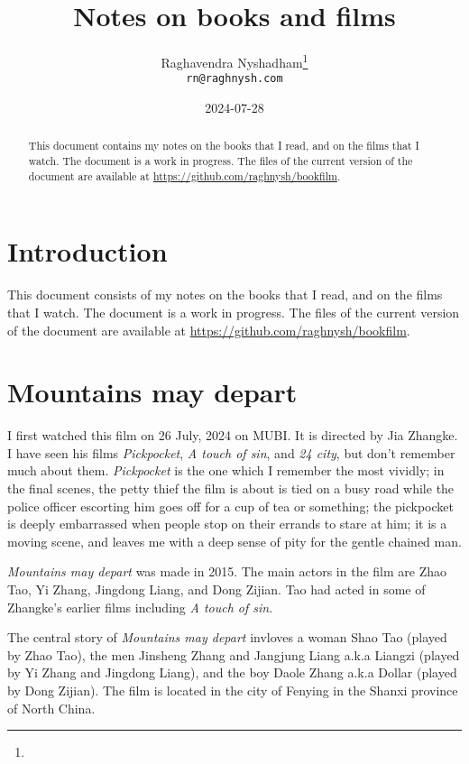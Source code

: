\documentclass{article}
\title{Notes on books and films}
\author{Raghavendra Nyshadham\thanks{\cczero} \\
  {\normalsize\nolinkurl{rn@raghnysh.com}}}
\date{2024-07-28}
\begin{document}
\begin{titlingpage}
  \maketitle

  \begin{abstract}
    This document contains my notes on the books that I read, and on
    the films that I watch.  The document is a work in progress.  The
    files of the current version of the document are available at
    \url{https://github.com/raghnysh/bookfilm}.

  \end{abstract}
\end{titlingpage}

\tableofcontents

\section{Introduction}
\label{sec:113nrd0o}

This document consists of my notes on the books that I read, and on
the films that I watch.  The document is a work in progress.  The
files of the current version of the document are available at
\url{https://github.com/raghnysh/bookfilm}.

\section{Mountains may depart}
\label{sec:ov8yna0s}

I first watched this film on 26 July, 2024 on MUBI.  It is directed by
Jia Zhangke.  I have seen his films \emph{Pickpocket}, \emph{A touch
  of sin}, and \emph{24 city}, but don't remember much about them.
\emph{Pickpocket} is the one which I remember the most vividly; in the
final scenes, the petty thief the film is about is tied on a busy road
while the police officer escorting him goes off for a cup of tea or
something; the pickpocket is deeply embarrassed when people stop on
their errands to stare at him; it is a moving scene, and leaves me
with a deep sense of pity for the gentle chained man.

\emph{Mountains may depart} was made in 2015.  The main actors in the
film are Zhao Tao, Yi Zhang, Jingdong Liang, and Dong Zijian.  Tao had
acted in some of Zhangke's earlier films including \emph{A touch of
  sin}.

The central story of \emph{Mountains may depart} invloves a woman Shao
Tao (played by Zhao Tao), the men Jinsheng Zhang and Jangjung Liang
a.k.a Liangzi (played by Yi Zhang and Jingdong Liang), and the boy
Daole Zhang a.k.a Dollar (played by Dong Zijian).  The film is located
in the city of Fenying in the Shanxi province of North China.
\end{document}
